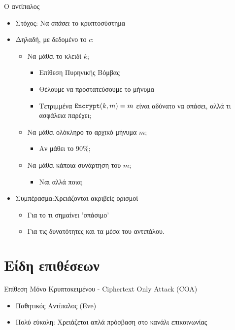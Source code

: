 \documentclass[handout]{beamer}
\begin{document}
\begin{frame}{Ο αντίπαλος \adv}
\begin{itemize}
\item Στόχος: Να \emph{σπάσει} το κρυπτοσύστημα 
\item Δηλαδή, με δεδομένο το $c$:
\pause
\begin{itemize}
\item Να μάθει το κλειδί $k$; 
\pause
\begin{itemize}
\item Επίθεση Πυρηνικής Βόμβας
\item Θέλουμε να προστατεύσουμε το μήνυμα
\item Τετριμμένα $\mathtt{Encrypt}(k,m)=m$ είναι αδύνατο να σπάσει, αλλά τι ασφάλεια παρέχει;
\end{itemize}
\pause
\item Να μάθει ολόκληρο το αρχικό μήνυμα $m$;
\begin{itemize}
\item Αν μάθει το 90\%;
\end{itemize}
\pause
\item Να μάθει κάποια συνάρτηση του $m$;
\begin{itemize}
\item Ναι αλλά ποια;
\end{itemize}
\end{itemize}
\pause
\item Συμπέρασμα:Χρειάζονται ακριβείς ορισμοί
\begin{itemize}
\item Για το τι σημαίνει 'σπάσιμο'
\item Για τις δυνατότητες και τα μέσα του αντιπάλου.
\end{itemize}
\end{itemize}
\end{frame}

\section{Είδη επιθέσεων}
 
\begin{frame}{Επίθεση Μόνο Κρυπτοκειμένου - Ciphertext Only Attack (COA)}
\begin{itemize}
\item Παθητικός Αντίπαλος (Eve)
\item Πολύ εύκολη: Χρειάζεται απλά πρόσβαση στο κανάλι επικοινωνίας
\end{itemize}
\end{frame}
\end{document}
